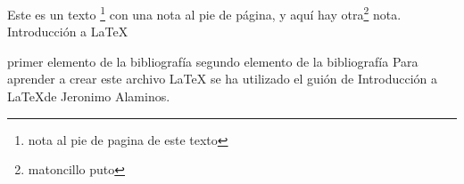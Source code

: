 \documentclass[a4paper]{article}
\begin{document}
Este es un texto \footnote{nota al pie de pagina de este texto} 
con una nota al pie de página, y aquí hay otra\footnote{matoncillo puto} 
nota.
\label{Latex_Basico}Introducción a LaTeX
\newpage
\begin{thebibliography}{99}
   primer elemento de la bibliografía
   segundo elemento de la bibliografía
   Para aprender a crear este archivo \LaTeX
  se ha utilizado el guión de Introducción a \LaTeX de Jeronimo Alaminos. 
  \cite[2]{Jeronimo Alaminos}
\end{thebibliography}
\end{document}
